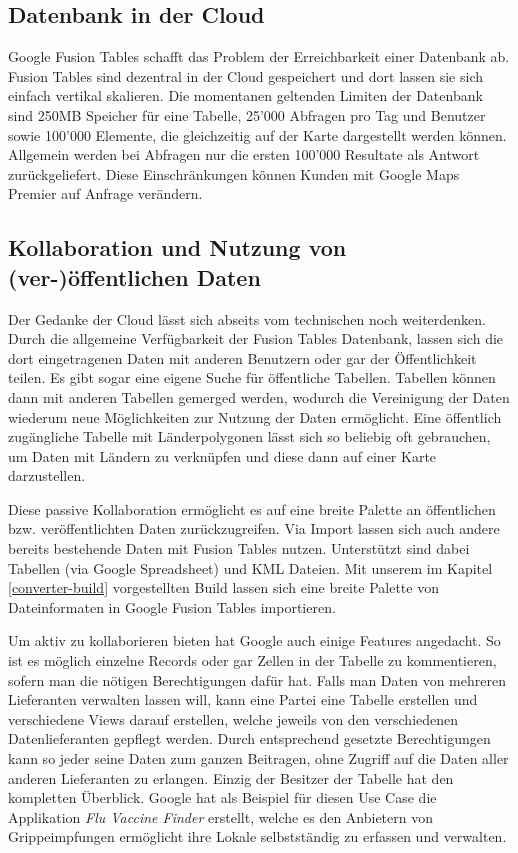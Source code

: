 \subsection{Datenbank in der Cloud}
Google Fusion Tables schafft das Problem der Erreichbarkeit einer Datenbank ab. Fusion Tables sind dezentral in der Cloud gespeichert und dort lassen sie sich einfach vertikal skalieren. Die momentanen geltenden Limiten der Datenbank sind 250MB Speicher für eine Tabelle, 25'000 Abfragen pro Tag und Benutzer sowie 100'000 Elemente, die gleichzeitig auf der Karte dargestellt werden können. Allgemein werden bei Abfragen nur die ersten 100'000 Resultate als Antwort zurückgeliefert. Diese Einschränkungen können Kunden mit Google Maps Premier auf Anfrage verändern. \cite{fusion-tables-geo-limits}

\subsection{Kollaboration und Nutzung von (ver-)öffentlichen Daten}
Der Gedanke der Cloud lässt sich abseits vom technischen noch weiterdenken. Durch die allgemeine Verfügbarkeit der Fusion Tables Datenbank, lassen sich die dort eingetragenen Daten mit anderen Benutzern oder gar der Öffentlichkeit teilen. Es gibt sogar eine eigene Suche für öffentliche Tabellen.\cite{fusion-tables-search} Tabellen können dann mit anderen Tabellen gemerged werden, wodurch die Vereinigung der Daten wiederum neue Möglichkeiten zur Nutzung der Daten ermöglicht. Eine öffentlich zugängliche Tabelle mit Länderpolygonen lässt sich so beliebig oft gebrauchen, um Daten mit Ländern zu verknüpfen und diese dann auf einer Karte darzustellen.

Diese passive Kollaboration ermöglicht es auf eine breite Palette an öffentlichen bzw. veröffentlichten Daten zurückzugreifen. Via Import lassen sich auch andere bereits bestehende Daten mit Fusion Tables nutzen. Unterstützt sind dabei Tabellen (via Google Spreadsheet) und KML Dateien. Mit unserem im Kapitel \ref{converter-build} vorgestellten Build lassen sich eine breite Palette von Dateinformaten in Google Fusion Tables importieren.

Um aktiv zu kollaborieren bieten hat Google auch einige Features angedacht. So ist es möglich einzelne Records oder gar Zellen in der Tabelle zu kommentieren, sofern man die nötigen Berechtigungen dafür hat. Falls man Daten von mehreren Lieferanten verwalten lassen will, kann eine Partei eine Tabelle erstellen und verschiedene Views darauf erstellen, welche jeweils von den verschiedenen Datenlieferanten gepflegt werden. Durch entsprechend gesetzte Berechtigungen kann so jeder seine Daten zum ganzen Beitragen, ohne Zugriff auf die Daten aller anderen Lieferanten zu erlangen. Einzig der Besitzer der Tabelle hat den kompletten Überblick. Google hat als Beispiel für diesen Use Case die Applikation \emph{Flu Vaccine Finder} erstellt, welche es den Anbietern von Grippeimpfungen ermöglicht ihre Lokale selbstständig zu erfassen und verwalten.\cite{data-gathering}

